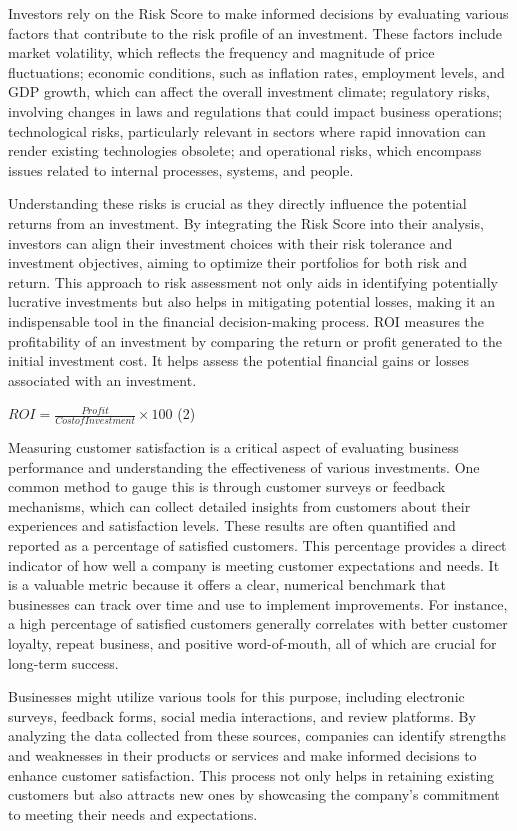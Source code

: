 {Investors rely on the Risk Score to make informed decisions by
evaluating various factors that contribute to the risk profile of an
investment. These factors include market volatility, which reflects the
frequency and magnitude of price fluctuations; economic conditions, such
as inflation rates, employment levels, and GDP growth, which can affect
the overall investment climate; regulatory risks, involving changes in
laws and regulations that could impact business operations;
technological risks, particularly relevant in sectors where rapid
innovation can render existing technologies obsolete; and operational
risks, which encompass issues related to internal processes, systems,
and people.

Understanding these risks is crucial as they directly influence the
potential returns from an investment. By integrating the Risk Score into
their analysis, investors can align their investment choices with their
risk tolerance and investment objectives, aiming to optimize their
portfolios for both risk and return. This approach to risk assessment
not only aids in identifying potentially lucrative investments but also
helps in mitigating potential losses, making it an indispensable tool in
the financial decision-making process. ROI measures the profitability of
an investment by comparing the return or profit generated to the initial
investment cost. It helps assess the potential financial gains or losses
associated with an investment.

\(ROI = \frac{Profit}{CostofInvestment} \times 100\) (2)

Measuring customer satisfaction is a critical aspect of evaluating
business performance and understanding the effectiveness of various
investments. One common method to gauge this is through customer surveys
or feedback mechanisms, which can collect detailed insights from
customers about their experiences and satisfaction levels. These results
are often quantified and reported as a percentage of satisfied
customers. This percentage provides a direct indicator of how well a
company is meeting customer expectations and needs. It is a valuable
metric because it offers a clear, numerical benchmark that businesses
can track over time and use to implement improvements. For instance, a
high percentage of satisfied customers generally correlates with better
customer loyalty, repeat business, and positive word-of-mouth, all of
which are crucial for long-term success.

Businesses might utilize various tools for this purpose, including
electronic surveys, feedback forms, social media interactions, and
review platforms. By analyzing the data collected from these sources,
companies can identify strengths and weaknesses in their products or
services and make informed decisions to enhance customer satisfaction.
This process not only helps in retaining existing customers but also
attracts new ones by showcasing the company's commitment to meeting
their needs and expectations.

}
